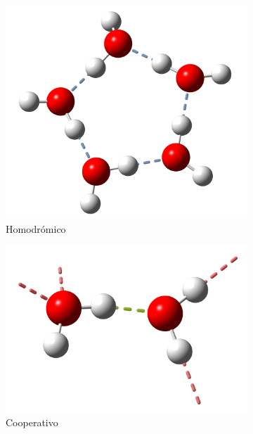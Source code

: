 \begin{figure}[b!]
\centering
\begin{subfigure}[b]{0.3\linewidth}
\includegraphics[width=\linewidth]{2/img/pentamero}
\caption{Homodrómico}
\label{pentamero}
\end{subfigure}
\begin{subfigure}[b]{0.3\linewidth}
\includegraphics[width=\linewidth]{2/img/dimero_b}
\caption{Cooperativo}
\label{dimero_b}
\end{subfigure}
\begin{subfigure}[b]{0.3\linewidth}

\end{subfigure}
\end{figure}
